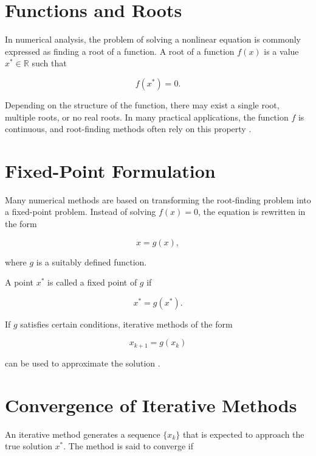 \section{Functions and Roots}

In numerical analysis, the problem of solving a nonlinear equation is commonly expressed as finding a root of a function. A root of a function \( f(x) \) is a value \( x^* \in \mathbb{R} \) such that

\begin{equation}
f(x^*) = 0.
\end{equation}

Depending on the structure of the function, there may exist a single root, multiple roots, or no real roots. In many practical applications, the function \( f \) is continuous, and root-finding methods often rely on this property \cite{burden, atkinson}.

\section{Fixed-Point Formulation}

Many numerical methods are based on transforming the root-finding problem into a fixed-point problem. Instead of solving \( f(x) = 0 \), the equation is rewritten in the form

\begin{equation}
x = g(x),
\end{equation}

where \( g \) is a suitably defined function.

A point \( x^* \) is called a fixed point of \( g \) if

\begin{equation}
x^* = g(x^*).
\end{equation}

If \( g \) satisfies certain conditions, iterative methods of the form

\begin{equation}
x_{k+1} = g(x_k)
\end{equation}

can be used to approximate the solution \cite{burden}.

\section{Convergence of Iterative Methods}

An iterative method generates a sequence \( \{x_k\} \) that is expected to approach the true solution \( x^* \). The method is said to converge if

